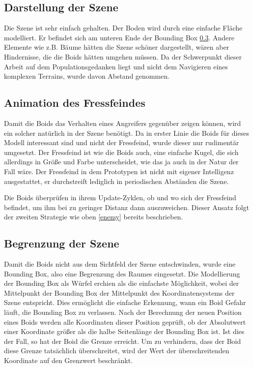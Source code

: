 \documentclass[draft=false
              ,paper=a4
              ,twoside=false
              ,fontsize=11pt
              ,headsepline
              ,BCOR10mm
              ,DIV11
              ,bibtotoc
              ,liststotoc
              ]{scrbook}
\begin{document}
\subsection{Darstellung der Szene}
Die Szene ist sehr einfach gehalten. Der Boden wird durch eine einfache Fläche modelliert. Er befindet sich am unteren Ende der Bounding Box \ref{box}. Andere Elemente wie z.B. Bäume hätten die Szene schöner dargestellt, wären aber Hindernisse, die die Boids hätten umgehen müssen. Da der Schwerpunkt dieser Arbeit auf dem Populationsgedanken liegt und nicht dem Navigieren eines komplexen Terrains, wurde davon Abstand genommen.
\subsection{Animation des Fressfeindes}
Damit die Boids das Verhalten eines Angreifers gegenüber zeigen können, wird ein solcher natürlich in der Szene benötigt. Da in erster Linie die Boids für dieses Modell interessant sind und nicht der Fressfeind, wurde dieser nur rudimentär umgesetzt. Der Fressfeind ist wie die Boids auch, eine einfache Kugel, die sich allerdings in Größe und Farbe unterscheidet, wie das ja auch in der Natur der Fall wäre. Der Fressfeind in dem Prototypen ist nicht mit eigener Intelligenz ausgestattet, er durchstreift lediglich in periodischen Abständen die Szene.

Die Boids überprüfen in ihrem Update-Zyklen, ob und wo sich der Fressfeind befindet, um ihm bei zu geringer Distanz dann auszuweichen. Dieser Ansatz folgt der zweiten Strategie wie oben \ref{enemy} bereits beschrieben.
\subsection{Begrenzung der Szene}\label{box}
Damit die Boids nicht aus dem Sichtfeld der Szene entschwinden, wurde eine Bounding Box, also eine Begrenzung des Raumes eingesetzt. Die Modellierung der Bounding Box als Würfel erchien als die einfachste Möglichkeit, wobei der Mittelpunkt der Bounding Box der Mittelpunkt des Koordinatensystems der Szene entspricht. Dies ermöglicht die einfache Erkennung, wann ein Boid Gefahr läuft, die Bounding Box zu verlassen. Nach der Berechnung der neuen Position eines Boids werden alle Koordinaten dieser Position geprüft, ob der Absolutwert einer Koordinate größer als die halbe Seitenlänge der Bounding Box ist. Ist dies der Fall, so hat der Boid die Grenze erreicht. Um zu verhindern, dass der Boid diese Grenze tatsächlich überschreitet, wird der Wert der überschreitenden Koordinate auf den Grenzwert beschränkt.
\end{document}
